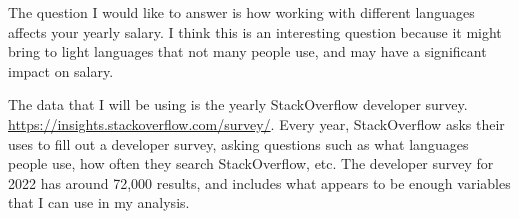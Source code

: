 \documentclass{article}
\begin{document}
  The question I would like to answer is how working with different languages affects your yearly salary. I think this is an interesting question because it might bring to light languages that not many people use, and may have a significant impact on salary.

  The data that I will be using is the yearly StackOverflow developer survey.
  \url{https://insights.stackoverflow.com/survey/}. Every year, StackOverflow asks their uses to fill out a developer survey, asking questions such as what languages people use, how often they search StackOverflow, etc. The developer survey for 2022 has around 72,000 results, and includes what appears to be enough variables that I can use in my analysis.
\end{document}
